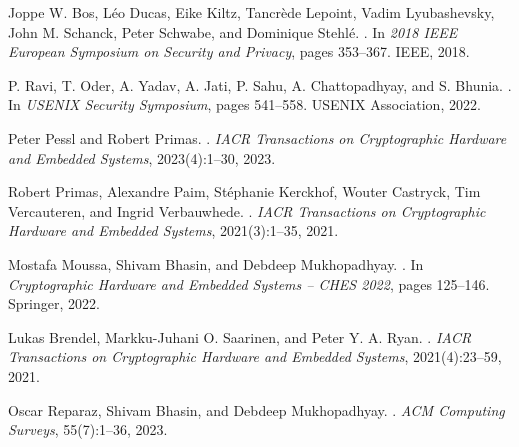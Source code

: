 \documentclass[11pt,a4paper]{article}
\begin{document}
\begin{thebibliography}{9}

Joppe W. Bos, L{\'e}o Ducas, Eike Kiltz, Tancr\`ede Lepoint, Vadim Lyubashevsky, John M. Schanck, Peter Schwabe, and Dominique Stehl{\'e}.
.
\newblock In \emph{2018 IEEE European Symposium on Security and Privacy}, pages 353--367. IEEE, 2018.

P. Ravi, T. Oder, A. Yadav, A. Jati, P. Sahu, A. Chattopadhyay, and S. Bhunia.
.
\newblock In \emph{USENIX Security Symposium}, pages 541--558. USENIX Association, 2022.

Peter Pessl and Robert Primas.
.
\newblock \emph{IACR Transactions on Cryptographic Hardware and Embedded Systems}, 2023(4):1--30, 2023.

Robert Primas, Alexandre Paim, St{\'e}phanie Kerckhof, Wouter Castryck, Tim Vercauteren, and Ingrid Verbauwhede.
.
\newblock \emph{IACR Transactions on Cryptographic Hardware and Embedded Systems}, 2021(3):1--35, 2021.

Mostafa Moussa, Shivam Bhasin, and Debdeep Mukhopadhyay.
.
\newblock In \emph{Cryptographic Hardware and Embedded Systems -- CHES 2022}, pages 125--146. Springer, 2022.

Lukas Brendel, Markku-Juhani O. Saarinen, and Peter Y. A. Ryan.
.
\newblock \emph{IACR Transactions on Cryptographic Hardware and Embedded Systems}, 2021(4):23--59, 2021.

Oscar Reparaz, Shivam Bhasin, and Debdeep Mukhopadhyay.
.
\newblock \emph{ACM Computing Surveys}, 55(7):1--36, 2023.

\end{thebibliography}
\end{document}
